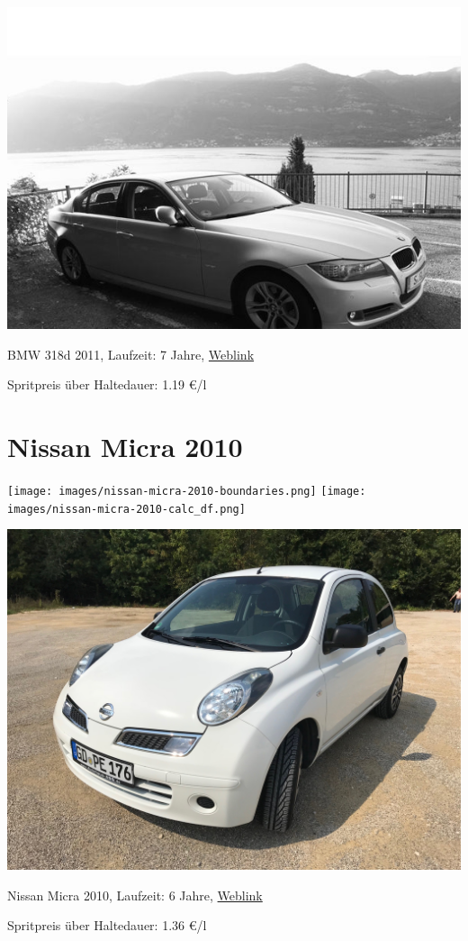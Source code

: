 \documentclass[landscape, DIV=99, 14pt]{scrartcl}
\begin{document}
\pagebreak
\null
\vspace{2cm}
\begin{center}
\includegraphics[width=0.9\columnwidth]{cars/bmw-3er-maximus.png}

BMW 318d 2011, Laufzeit: 7 Jahre, \href{https://de.wikipedia.org/wiki/BMW_E90}{Weblink}

Spritpreis \"uber Haltedauer: 1.19 \euro{}/l

\end{center}

\pagebreak


\twocolumn

\section*{Nissan Micra 2010}
\begin{center}
\texttt{[image: images/nissan-micra-2010-boundaries.png]}
\null
\vspace{0.5cm}
\texttt{[image: images/nissan-micra-2010-calc\_df.png]}
\end{center}

\pagebreak
\null
\vspace{2cm}
\begin{center}
\includegraphics[width=0.9\columnwidth]{cars/nissan-micra.jpg}

Nissan Micra 2010, Laufzeit: 6 Jahre, \href{https://de.wikipedia.org/wiki/Nissan_Micra\#Micra_(K12,_2003%E2%80%932010)}{Weblink}

Spritpreis \"uber Haltedauer: 1.36 \euro{}/l

\end{center}
\end{document}
